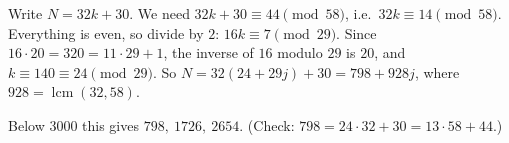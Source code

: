 Write $N=32k+30$. We need $32k+30\equiv44\pmod{58}$, i.e.\ $32k\equiv14\pmod{58}$. Everything is even, so divide by $2$: $16k\equiv7\pmod{29}$. Since $16\cdot20=320=11\cdot29+1$, the inverse of $16$ modulo $29$ is $20$, and $k\equiv140\equiv24\pmod{29}$. So $N=32(24+29j)+30=798+928j$, where $928=\operatorname{lcm}(32,58)$.

Below $3000$ this gives $\boxed{798,\ 1726,\ 2654}$. (Check: $798=24\cdot32+30=13\cdot58+44$.)
